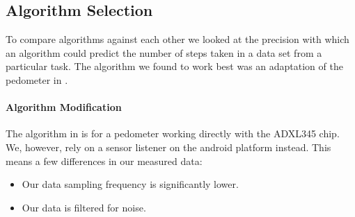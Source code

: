 \subsection{Algorithm Selection}
To compare algorithms against each other we looked at the precision with which an algorithm could predict the number of steps taken in a data set from a particular task. The algorithm we found to work best was an adaptation of the pedometer in \citet{zhao:pedometer}.

\paragraph{Algorithm Modification}
The algorithm in \citet{zhao:pedometer} is for a pedometer working directly with the ADXL345 chip. We, however, rely on a sensor listener on the android platform instead. This means a few differences in our measured data:
\begin{itemize}
\item Our data sampling frequency is significantly lower. 
\item Our data is filtered for noise.
\end{itemize} 

